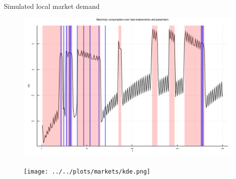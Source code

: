 \documentclass[xcolor={svgnames}]{beamer}
\begin{document}
\begin{frame}{Simulated local market demand}

    \begin{figure}
        \centering
        \begin{minipage}{.5\textwidth}
            \centering
            \includegraphics[width=\linewidth]{../../plots/markets/simul.png}
        \end{minipage}%
        \begin{minipage}{.5\textwidth}
            \centering
            \texttt{[image: ../../plots/markets/kde.png]}
        \end{minipage}
    \end{figure}

\end{frame}
\end{document}
